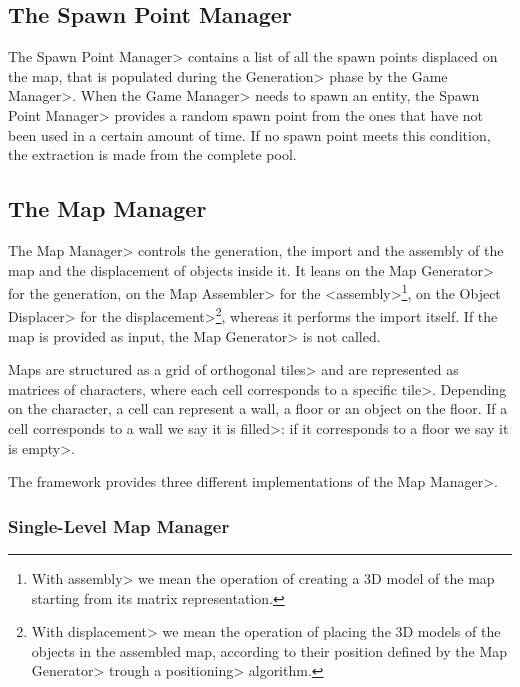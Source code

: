 
\subsection{The Spawn Point Manager}

The \<Spawn Point Manager> contains a list of all the spawn points displaced on the map, that is populated during the \<Generation> phase by the \<Game Manager>. When the \<Game Manager> needs to spawn an entity, the \<Spawn Point Manager> provides a random spawn point from the ones that have not been used in a certain amount of time. If no spawn point meets this condition, the extraction is made from the complete pool.


\subsection{The Map Manager}

The \<Map Manager> controls the generation, the import and the assembly of the map and the displacement of objects inside it. It leans on the \<Map Generator> for the generation, on the \<Map Assembler> for the <assembly>\footnote{With \<assembly> we mean the operation of creating a 3D model of the map starting from its matrix representation.}, on the \<Object Displacer> for the \<displacement>\footnote{With \<displacement> we mean the operation of placing the 3D models of the objects in the assembled map, according to their position defined by the \<Map Generator> trough a \<positioning> algorithm.}, whereas it performs the import itself. If the map is provided as input, the \<Map Generator> is not called.

\par

Maps are structured as a grid of orthogonal \<tiles> and are represented as matrices of characters, where each cell corresponds to a specific \<tile>. Depending on the character, a cell can represent a wall, a floor or an object on the floor. If a cell corresponds to a wall we say it is \<filled>: if it corresponds to a floor we say it is \<empty>.

\par

The framework provides three different implementations of the \<Map Manager>.

\subsubsection{Single-Level Map Manager}

